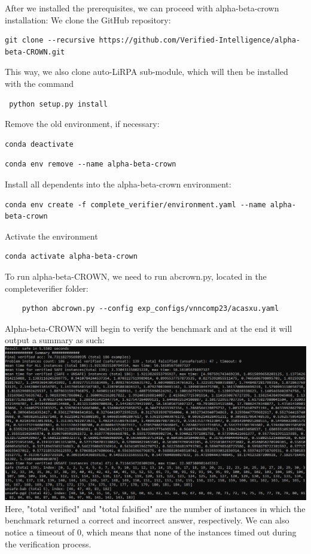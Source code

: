 \documentclass{article}
\begin{document}
After we installed the prerequisites, we can proceed with alpha-beta-crown installation:
We clone the GitHub repository:
\begin{verbatim}git clone --recursive https://github.com/Verified-Intelligence/alpha-beta-CROWN.git\end{verbatim}
This way, we also clone auto-LiRPA sub-module, which will then be installed with the command \begin{verbatim} python setup.py install\end{verbatim}
Remove the old environment, if necessary:
\begin{verbatim}conda deactivate\end{verbatim}
\begin{verbatim}conda env remove --name alpha-beta-crown\end{verbatim}

Install all dependents into the alpha-beta-crown environment:
\begin{verbatim}conda env create -f complete_verifier/environment.yaml --name alpha-beta-crown\end{verbatim}

Activate the environment
\begin{verbatim}conda activate alpha-beta-crown\end{verbatim}
To run alpha-beta-CROWN, we need to run abcrown.py, located in the complete\textunderscore verifier folder:
\begin{verbatim}
    python abcrown.py --config exp_configs/vnncomp23/acasxu.yaml
\end{verbatim}
Alpha-beta-CROWN will begin to verify the benchmark and at the end it will output a summary as such:\newline
\includegraphics[scale=0.6]{alphabeta.jpg}
\newline
Here, "total verified" and "total falsified" are the number of instances in which the benchmark returned a correct and incorrect answer, respectively. We can also notice a timeout of 0, which means that none of the instances timed out during the verification process.
\end{document}
